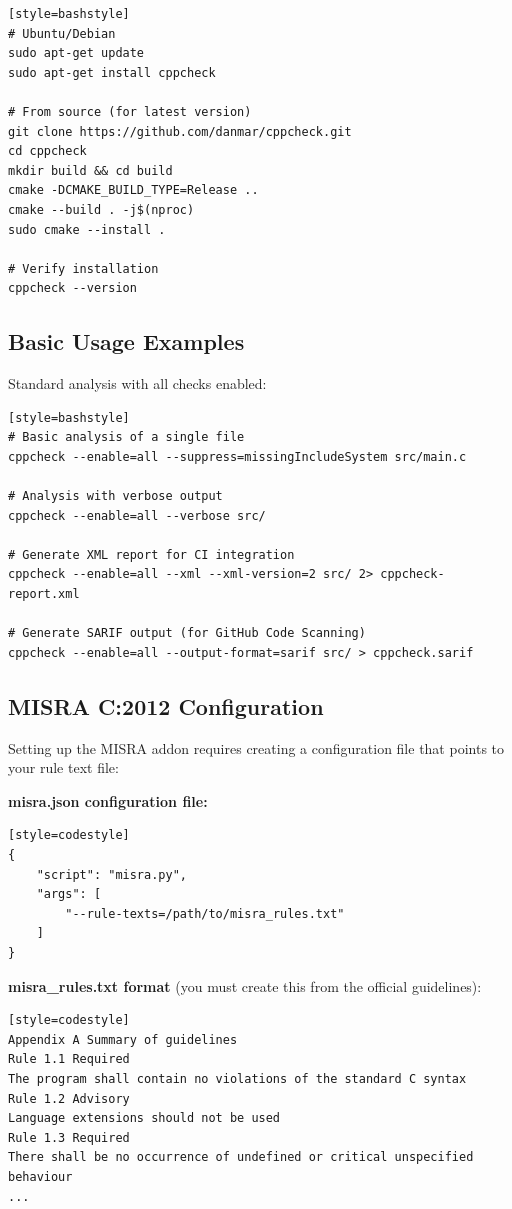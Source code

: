 \documentclass[11pt,letterpaper]{report}
\begin{document}
\begin{verbatim}[style=bashstyle]
# Ubuntu/Debian
sudo apt-get update
sudo apt-get install cppcheck

# From source (for latest version)
git clone https://github.com/danmar/cppcheck.git
cd cppcheck
mkdir build && cd build
cmake -DCMAKE_BUILD_TYPE=Release ..
cmake --build . -j$(nproc)
sudo cmake --install .

# Verify installation
cppcheck --version
\end{verbatim}

\subsection{Basic Usage Examples}

Standard analysis with all checks enabled:

\begin{verbatim}[style=bashstyle]
# Basic analysis of a single file
cppcheck --enable=all --suppress=missingIncludeSystem src/main.c

# Analysis with verbose output
cppcheck --enable=all --verbose src/

# Generate XML report for CI integration
cppcheck --enable=all --xml --xml-version=2 src/ 2> cppcheck-report.xml

# Generate SARIF output (for GitHub Code Scanning)
cppcheck --enable=all --output-format=sarif src/ > cppcheck.sarif
\end{verbatim}

\subsection{MISRA C:2012 Configuration}

Setting up the MISRA addon requires creating a configuration file that points to your rule text file:

\textbf{misra.json configuration file:}

\begin{verbatim}[style=codestyle]
{
    "script": "misra.py",
    "args": [
        "--rule-texts=/path/to/misra_rules.txt"
    ]
}
\end{verbatim}

\textbf{misra\_rules.txt format} (you must create this from the official guidelines):

\begin{verbatim}[style=codestyle]
Appendix A Summary of guidelines
Rule 1.1 Required
The program shall contain no violations of the standard C syntax
Rule 1.2 Advisory
Language extensions should not be used
Rule 1.3 Required
There shall be no occurrence of undefined or critical unspecified behaviour
...
\end{verbatim}
\end{document}
